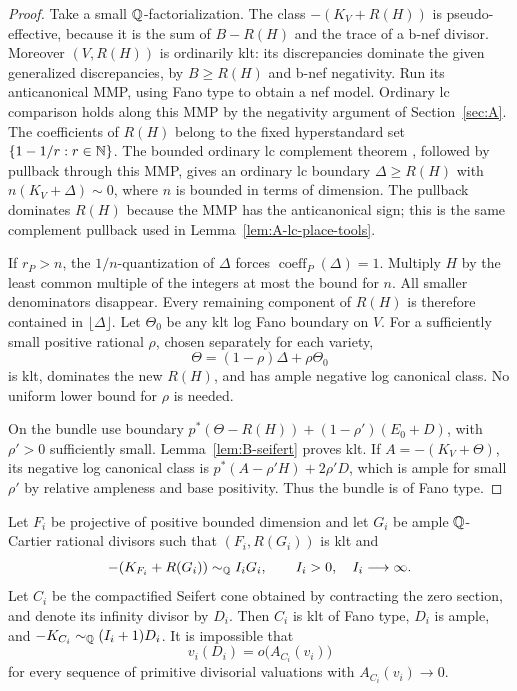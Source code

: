 \begin{proof}
Take a small $\mathbb Q$-factorialization.  The class $-(K_V+R(H))$ is
pseudo-effective, because it is the sum of $B-R(H)$ and the trace
of a b-nef divisor.  Moreover $(V,R(H))$ is ordinarily klt:
its discrepancies dominate the given generalized discrepancies,
by $B\ge R(H)$ and b-nef negativity.  Run its anticanonical MMP,
using Fano type to obtain a nef model.  Ordinary lc comparison
holds along this MMP by the negativity argument of
Section~\ref{sec:A}.  The coefficients of
$R(H)$ belong to the fixed hyperstandard set
$\{1-1/r:r\in\mathbb N\}$.  The bounded ordinary lc complement theorem
\cite[Theorems~1.7--1.8]{BirkarComplements}, followed by pullback
through this MMP, gives an ordinary lc boundary
$\Delta\ge R(H)$ with $n(K_V+\Delta)\sim0$, where $n$ is bounded
in terms of dimension.  The pullback dominates $R(H)$ because the
MMP has the anticanonical sign; this is the same complement
pullback used in Lemma~\ref{lem:A-lc-place-tools}.

If $r_P>n$, the $1/n$-quantization of $\Delta$ forces
$\operatorname{coeff}_P(\Delta)=1$.  Multiply $H$ by the least
common multiple of the integers at most the bound for $n$.
All smaller denominators disappear.  Every remaining component of
$R(H)$ is therefore contained in $\lfloor\Delta\rfloor$.
Let $\Theta_0$ be any klt log Fano boundary on $V$.  For a
sufficiently small positive rational $\rho$, chosen separately for
each variety,
\[
 \Theta=(1-\rho)\Delta+\rho\Theta_0
\]
is klt, dominates the new $R(H)$, and has ample negative log
canonical class.  No uniform lower bound for $\rho$ is needed.

On the bundle use boundary
$p^*(\Theta-R(H))+(1-\rho')(E_0+D)$, with $\rho'>0$ sufficiently
small.  Lemma~\ref{lem:B-seifert} proves klt.  If
$A=-(K_V+\Theta)$, its negative log canonical class is
$p^*(A-\rho'H)+2\rho'D$, which is ample for small $\rho'$ by
relative ampleness and base positivity.  Thus the bundle is of
Fano type.
\end{proof}

\begin{lemma}\label{lem:B-unbounded-index}
Let $F_i$ be projective of positive bounded dimension and let $G_i$
be ample $\mathbb Q$-Cartier rational divisors such that $(F_i,R(G_i))$
is klt and
\[
 -(K_{F_i}+R(G_i))\sim_{\mathbb Q}I_iG_i,
 \qquad I_i>0,\quad I_i\longrightarrow\infty.
\]
Let $C_i$ be the compactified Seifert cone obtained by contracting
the zero section, and denote its infinity divisor by $D_i$.
Then $C_i$ is klt of Fano type, $D_i$ is ample, and
$-K_{C_i}\sim_{\mathbb Q}(I_i+1)D_i$.  It is impossible that
\begin{equation}\label{eq:B-cone-small-height}
 v_i(D_i)=o\bigl(A_{C_i}(v_i)\bigr)
\end{equation}
for every sequence of primitive divisorial valuations with
$A_{C_i}(v_i)\to0$.
\end{lemma}

